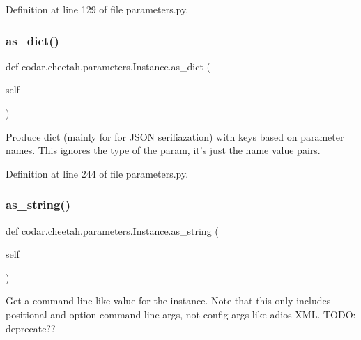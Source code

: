 Definition at line 129 of file parameters.\+py.

\mbox{\label{classcodar_1_1cheetah_1_1parameters_1_1_instance_ae978374d4b5e01c2764b9513ae38a961}} 
\subsubsection{\texorpdfstring{as\+\_\+dict()}{as\_dict()}}
{\footnotesize\ttfamily def codar.\+cheetah.\+parameters.\+Instance.\+as\+\_\+dict (\begin{DoxyParamCaption}\item[{}]{self }\end{DoxyParamCaption})}

\begin{DoxyVerb}Produce dict (mainly for for JSON seriliazation) with keys based on
parameter names. This ignores the type of the param, it's just the
name value pairs.
\end{DoxyVerb}
 

Definition at line 244 of file parameters.\+py.

\mbox{\label{classcodar_1_1cheetah_1_1parameters_1_1_instance_a053717fc3ee7840a7c32173f15e99ae3}} 
\subsubsection{\texorpdfstring{as\+\_\+string()}{as\_string()}}
{\footnotesize\ttfamily def codar.\+cheetah.\+parameters.\+Instance.\+as\+\_\+string (\begin{DoxyParamCaption}\item[{}]{self }\end{DoxyParamCaption})}

\begin{DoxyVerb}Get a command line like value for the instance. Note that this
only includes positional and option command line args, not config
args like adios XML. TODO: deprecate??\end{DoxyVerb}
 


